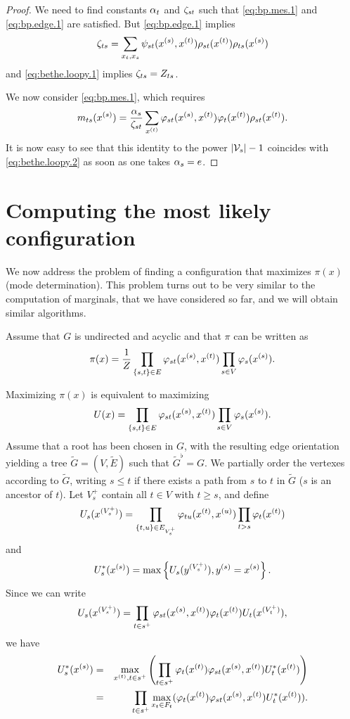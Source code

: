 \begin{proof}
We need to find constants $\alpha_t$ and $\zeta_{st}$ such that
\cref{eq:bp.mes.1} and \cref{eq:bp.edge.1} are satisfied. 
 But \cref{eq:bp.edge.1} implies
\[
\zeta_{ts} = \sum_{x_t, x_s} \psi_{st}(x^{(s)}, x^{(t)}) \rho_{st}(x^{(t)})
\rho_{ts}(x^{(s)})
\]
and \cref{eq:bethe.loopy.1} implies $\zeta_{ts} =  Z_{ts}$.

We now consider \cref{eq:bp.mes.1}, which requires
\[
m_{ts}(x^{(s)}) = \frac{\alpha_s}{\zeta_{st}} \sum_{x^{(t)}} \varphi_{st}(x^{(s)}, x^{(t)})
\varphi_t(x^{(t)}) \rho_{st}(x^{(t)}). 
\]
It is now easy to see that this identity to the power $|{\mathcal V}_s| - 1$
coincides with \cref{eq:bethe.loopy.2} as soon as one takes
$\alpha_s = e$. 
\end{proof}

\section{Computing the most likely configuration}
We now address the problem of finding a configuration that maximizes
$\pi(x)$ (mode determination). This problem turns out to be very similar to the
computation of marginals, that we have considered so far, and we will
obtain similar algorithms.

Assume that  $G$ is undirected and acyclic
and that $\pi$ can be written as
\[
\pi(x) = \frac{1}{Z} \prod_{\left\{ s,t \right\}\in E} \varphi_{st}(x^{(s)},x^{(t)})
\prod_{s\in V} \varphi_s(x^{(s)}).
\]

Maximizing $\pi(x)$ is equivalent  to maximizing
\begin{equation}
\label{eq:u.max}
U(x) = \prod_{\left\{ s,t \right\}\in E} \varphi_{st}(x^{(s)},x^{(t)})
\prod_{s\in V} \varphi_s(x^{(s)}).
\end{equation}
Assume that a root has been chosen in $G$, with the resulting edge orientation yielding a tree $\tilde G = (V, \tilde
E)$ such that $\tilde G^\flat = G$. We partially order the vertexes according
to $\tilde G$, writing $s\leq t$ if there exists a path from $s$ to $t$
in $\tilde G$ ($s$ is an ancestor of $t$). Let $V_s^+$ contain all
$t\in V$ with $t\geq s$, and define
\[
U_s(x^{(V_s^+)}) =  \prod_{\left\{ t,u \right\}\in E_{V_s^+}} \varphi_{tu}(x^{(t)}, x^{(u)})
\prod_{t > s} \varphi_t(x^{(t)})
\]
and
\begin{equation}
\label{eq:us*}
U^*_s(x^{(s)}) = \max\left\{ U_s(y^{(V_s^+)}), y^{(s)} = x^{(s)} \right\}.
\end{equation}
Since we can write
\begin{equation}
\label{eq:us.dec}
U_s(x^{(V_s^+)}) =  \prod_{t\in s^+} \varphi_{st}(x^{(s)}, x^{(t)}) \varphi_t(x^{(t)})  U_t(x^{(V_t^+)}),
\end{equation}
we have
\begin{eqnarray}
\nonumber
U^*_s(x^{(s)}) &=& \max_{x^{(t)}, t\in s^+} \left( \prod_{t\in s^+} \varphi_t(x^{(t)})\varphi_{st}(x^{(s)}, x^{(t)}) U^*_t(x^{(t)})\right)\\
\label{eq:max.prod.1}
&=&   \prod_{t\in s^+} \max_{x_t\in F_t}(\varphi_t(x^{(t)})\varphi_{st}(x^{(s)}, x^{(t)}) U^*_t(x^{(t)})).
\end{eqnarray}

